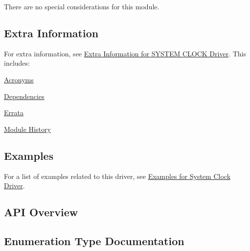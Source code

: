 There are no special considerations for this module.\hypertarget{group__asfdoc__sam0__system__clock__group_asfdoc_sam0_system_clock_extra_info}{}\subsection{Extra Information}\label{group__asfdoc__sam0__system__clock__group_asfdoc_sam0_system_clock_extra_info}
For extra information, see \hyperlink{asfdoc_sam0_system_clock_extra}{Extra Information for S\+Y\+S\+T\+E\+M C\+L\+O\+C\+K Driver}. This includes\+:
\begin{DoxyItemize}
\item \hyperlink{asfdoc_sam0_system_clock_extra_asfdoc_sam0_system_clock_extra_acronyms}{Acronyms}
\item \hyperlink{asfdoc_sam0_system_clock_extra_asfdoc_sam0_system_clock_extra_dependencies}{Dependencies}
\item \hyperlink{asfdoc_sam0_system_clock_extra_asfdoc_sam0_system_clock_extra_errata}{Errata}
\item \hyperlink{asfdoc_sam0_system_clock_extra_asfdoc_sam0_system_clock_extra_history}{Module History}
\end{DoxyItemize}\hypertarget{group__asfdoc__sam0__system__clock__group_asfdoc_sam0_system_clock_examples}{}\subsection{Examples}\label{group__asfdoc__sam0__system__clock__group_asfdoc_sam0_system_clock_examples}
For a list of examples related to this driver, see \hyperlink{asfdoc_sam0_system_clock_exqsg}{Examples for System Clock Driver}.\hypertarget{group__asfdoc__sam0__system__clock__group_asfdoc_sam0_system_clock_api_overview}{}\subsection{A\+P\+I Overview}\label{group__asfdoc__sam0__system__clock__group_asfdoc_sam0_system_clock_api_overview}


\subsection{Enumeration Type Documentation}
\hypertarget{group__asfdoc__sam0__system__clock__group_ga1ab9bb87560ad127ed982591b7d67311}{}
